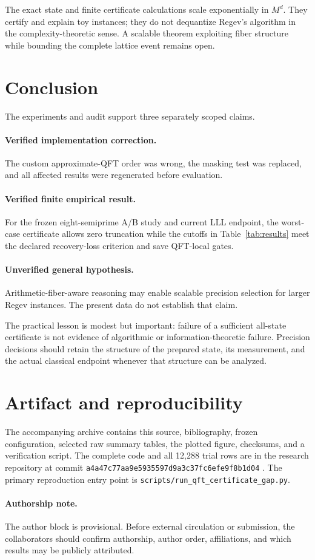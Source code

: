 \documentclass[10pt,twocolumn]{article}
\begin{document}
The exact state and finite certificate calculations scale exponentially in
$M^d$.  They certify and explain toy instances; they do not dequantize Regev's
algorithm in the complexity-theoretic sense.  A scalable theorem exploiting
fiber structure while bounding the complete lattice event remains open.

\section{Conclusion}

The experiments and audit support three separately scoped claims.

\paragraph{Verified implementation correction.}
The custom approximate-QFT order was wrong, the masking test was replaced,
and all affected results were regenerated before evaluation.

\paragraph{Verified finite empirical result.}
For the frozen eight-semiprime A/B study and current LLL endpoint, the
worst-case certificate allows zero truncation while the cutoffs in
Table~\ref{tab:results} meet the declared recovery-loss criterion and save
QFT-local gates.

\paragraph{Unverified general hypothesis.}
Arithmetic-fiber-aware reasoning may enable scalable precision selection for
larger Regev instances.  The present data do not establish that claim.

The practical lesson is modest but important: failure of a sufficient
all-state certificate is not evidence of algorithmic or information-theoretic
failure.  Precision decisions should retain the structure of the prepared
state, its measurement, and the actual classical endpoint whenever that
structure can be analyzed.

\section*{Artifact and reproducibility}

The accompanying archive contains this source, bibliography, frozen
configuration, selected raw summary tables, the plotted figure, checksums, and
a verification script.  The complete code and all 12,288 trial rows are in
the research repository at commit
\texttt{a4a47c77aa9e5935597d9a3c37fc6efe9f8b1d04}
\cite{Malik2026Artifact}.  The primary reproduction entry point is
\texttt{scripts/run\_qft\_certificate\_gap.py}.

\paragraph{Authorship note.}
The author block is provisional.  Before external circulation or submission,
the collaborators should confirm authorship, author order, affiliations, and
which results may be publicly attributed.



\end{document}
